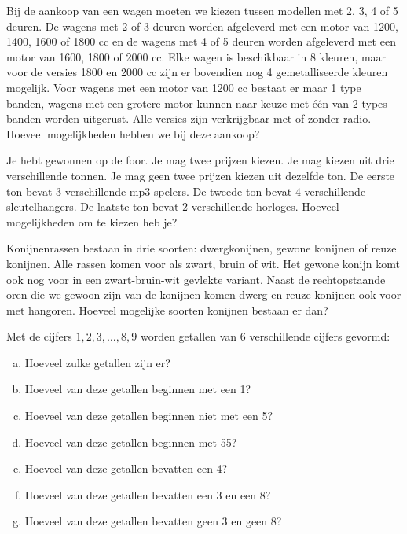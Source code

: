 \documentclass[12pt,a4paper,twoside]{article}
\begin{document}
\begin{oefening}
Bij de aankoop van een wagen moeten we kiezen tussen modellen met 2, 3, 4 of 5 deuren. De wagens met 2 of 3 deuren worden afgeleverd met een motor van 1200, 1400, 1600 of 1800 cc en de wagens met 4 of 5 deuren worden afgeleverd met een motor van 1600, 1800 of 2000 cc. Elke wagen is beschikbaar in 8 kleuren, maar voor de versies 1800 en 2000 cc zijn er bovendien nog 4 gemetalliseerde kleuren mogelijk. Voor wagens met een motor van 1200 cc bestaat er maar 1 type banden, wagens met een grotere motor kunnen naar keuze met één van 2 types banden worden uitgerust. Alle versies zijn verkrijgbaar met of zonder radio. Hoeveel mogelijkheden hebben we bij deze aankoop?
\end{oefening}

\begin{oefening}
Je hebt gewonnen op de foor. Je mag twee prijzen kiezen. Je mag kiezen uit drie verschillende tonnen. Je mag geen twee prijzen kiezen uit dezelfde ton. De eerste ton bevat 3 verschillende mp3-spelers. De tweede ton bevat 4 verschillende sleutelhangers. De laatste ton bevat 2 verschillende horloges. Hoeveel mogelijkheden om te kiezen heb je?
\end{oefening}

\begin{oefening}
Konijnenrassen bestaan in drie soorten: dwergkonijnen, gewone konijnen of reuze konijnen. Alle rassen komen voor als zwart, bruin of wit. Het gewone konijn komt ook nog voor in een zwart-bruin-wit gevlekte variant. Naast de rechtopstaande oren die we gewoon zijn van de konijnen komen dwerg en reuze konijnen ook voor met hangoren. Hoeveel mogelijke soorten konijnen bestaan er dan?
\end{oefening}

\begin{oefening}
Met de cijfers $1, 2, 3, \ldots , 8, 9$ worden getallen van 6 verschillende cijfers gevormd:
\begin{enumerate}[(a)]
  \item Hoeveel zulke getallen zijn er?
  \item Hoeveel van deze getallen beginnen met een 1?
  \item Hoeveel van deze getallen beginnen niet met een 5?
  \item Hoeveel van deze getallen beginnen met 55?
  \item Hoeveel van deze getallen bevatten een 4?
  \item Hoeveel van deze getallen bevatten een 3 en een 8?
  \item Hoeveel van deze getallen bevatten geen 3 en geen 8?
\end{enumerate}
\end{oefening}
\end{document}
